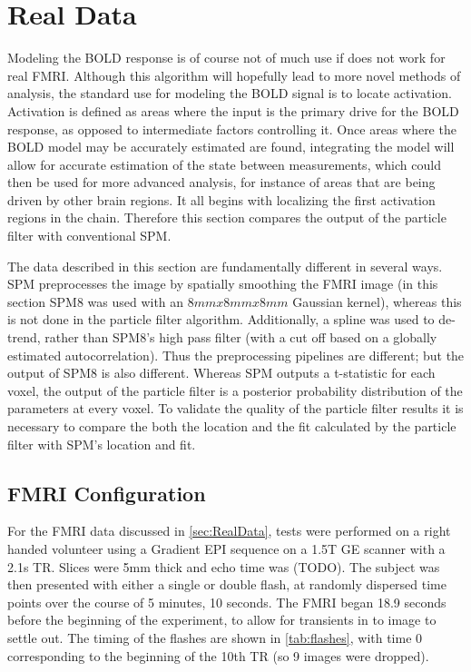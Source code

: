 \chapter{Real Data}
\label{sec:RealData}
Modeling the BOLD response is of course not of much use if does not work for
real FMRI.  Although this algorithm will hopefully lead to more novel methods 
of analysis, the standard use for modeling the BOLD signal is to locate activation.
Activation is defined as areas where the input is the primary drive
for the BOLD response, as opposed to intermediate factors controlling it. 
Once areas where the BOLD 
model may be accurately estimated are found, integrating the model will allow for accurate
estimation of the state between measurements, which could then be used for more 
advanced analysis, for instance of areas that are being driven by other brain regions.
It all begins with localizing the first activation regions in the
chain. Therefore this section compares the output of the particle filter 
with conventional SPM. 

The data described in this section are fundamentally different in several 
ways. SPM preprocesses the image by spatially smoothing the FMRI image (in this section 
SPM8 was used with an $8mm x 8mm x 8mm$ Gaussian kernel), whereas
this is not done in the particle filter algorithm. Additionally, a spline
was used to de-trend, rather than SPM8's high pass filter (with a cut
off based on a globally estimated autocorrelation). Thus the preprocessing pipelines 
are different; but the output of SPM8 is also different. Whereas SPM outputs
a t-statistic for each voxel, the output 
of the particle filter is a posterior probability distribution of the parameters
at every voxel. To validate the quality of the particle filter results 
it is necessary to compare the both the location and the fit calculated by the particle filter
with SPM's location and fit.

\section{FMRI Configuration}
For the FMRI data discussed in \autoref{sec:RealData}, tests were 
performed on a right handed volunteer using a Gradient EPI sequence
on a 1.5T GE scanner with a 2.1s TR. Slices were 5mm thick and echo
time was (TODO). The subject was then presented with either a single or
double flash, at randomly dispersed time points over the course of
5 minutes, 10 seconds. The FMRI began 18.9 seconds
before the beginning of the experiment, to allow for transients 
in to image to settle out. The timing of the flashes are shown in 
\autoref{tab:flashes}, with time 0 corresponding to the beginning of
the 10th TR (so 9 images were dropped). 

